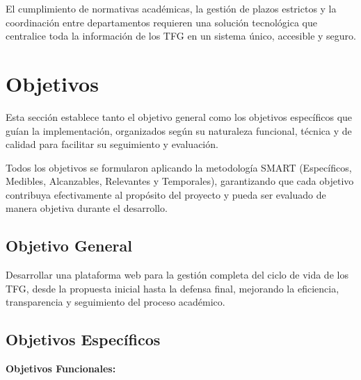 \documentclass[12pt,a4paper,oneside]{report}
\begin{document}
El cumplimiento de normativas académicas, la gestión de plazos estrictos y la coordinación entre departamentos requieren una solución tecnológica que centralice toda la información de los TFG en un sistema único, accesible y seguro.

\section{Objetivos}\label{objetivos}

Esta sección establece tanto el objetivo general como los objetivos específicos que guían la implementación, organizados según su naturaleza funcional, técnica y de calidad para facilitar su seguimiento y evaluación.

Todos los objetivos se formularon aplicando la metodología SMART (Específicos, Medibles, Alcanzables, Relevantes y Temporales), garantizando que cada objetivo contribuya efectivamente al propósito del proyecto y pueda ser evaluado de manera objetiva durante el desarrollo.

\subsection{Objetivo General}\label{objetivo-general}

Desarrollar una plataforma web para la gestión completa del ciclo de vida de los TFG, desde la propuesta inicial hasta la defensa final, mejorando la eficiencia, transparencia y seguimiento del proceso académico.

\subsection{Objetivos Específicos}\label{objetivos-especuxedficos}

\textbf{Objetivos Funcionales:}
\end{document}
